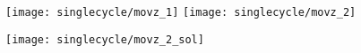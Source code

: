 \begin{blocksection}
\texttt{[image: singlecycle/movz\_1]}
\texttt{[image: singlecycle/movz\_2]}


\begin{solution}[0.5in]
 \texttt{[image: singlecycle/movz\_2\_sol]}
\end{solution}
\end{blocksection}